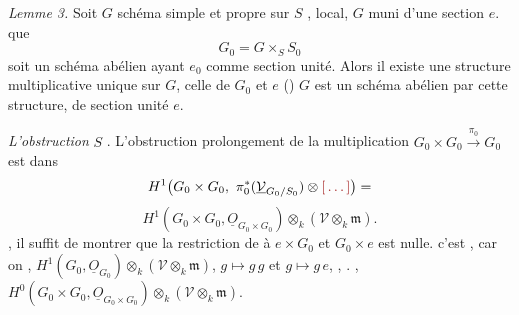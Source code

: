 \documentclass[11pt,a4paper]{article}
\begin{document}
\emph{Lemme 3.} Soit $G$ schéma simple et propre sur $S$  ,   local,  $G$ muni d'une section $e$.     \ill{} \ill{} \ill{}  que
\[
  G_0 = G \times_S S_0
\]
soit un schéma abélien ayant $e_0$ comme section unité.   Alors il existe une structure multiplicative unique sur $G$,  celle de $G_0$ et   $e$ \struck{\ill{} \ill{} \ill{} \ill{}}  () \ill{} \ill{}  $G$ est un schéma abélien par cette structure, de section unité $e$.

\emph{L'obstruction} \struck{\ill{}}    \ill{}  $S$  . L'obstruction \ill{}  prolongement de la multiplication $G_0 \times G_0 \xrightarrow{\ \pi_0\ } G_0$ est dans
\[
  H^1\bigl(G_0 \times G_0,\ \pi_0^{*}(\underline{\mathcal{V}}_{G_0/S_0}) \otimes \ill{}\bigr) = 
\]
\[
  H^1(G_0 \times G_0, \underline{O}_{G_0 \times G_0}) \otimes_{k} (\mathcal{V} \otimes_k \mathfrak{m}) .
\]
 , il suffit de montrer que la restriction de  à $e \times G_0$ et $G_0 \times e$ est nulle.  c'est , car on  \struck{\ill{}} ,  $H^1(G_0, \underline{O}_{G_0}) \otimes_k (\mathcal{V} \otimes_k \mathfrak{m})$, \ill{}     $g \mapsto g\,g$ et $g \mapsto g\,e$,    ,   .  , \ill{} \ill{} \ill{} \ill{}  $H^0(G_0 \times G_0, \underline{O}_{G_0 \times G_0}) \otimes_k (\mathcal{V} \otimes_k \mathfrak{m})$.
\end{document}

